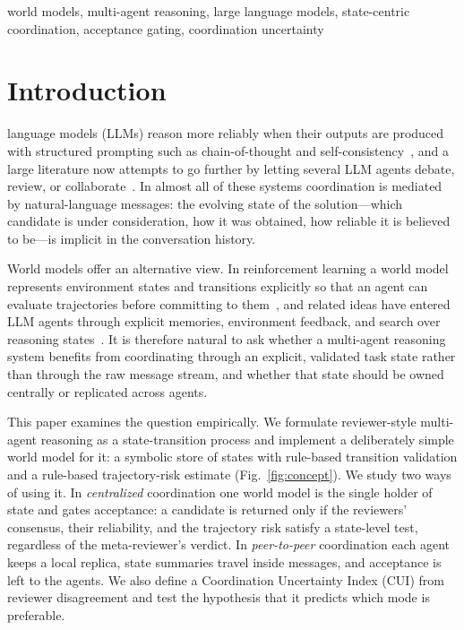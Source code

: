 \documentclass[lettersize,journal]{IEEEtran}
\begin{document}
\begin{IEEEkeywords}
world models, multi-agent reasoning, large language models, state-centric coordination, acceptance gating, coordination uncertainty
\end{IEEEkeywords}

\section{Introduction}

 language models (LLMs) reason more reliably when their outputs are produced with structured prompting such as chain-of-thought and self-consistency~\cite{wei2022chain,wang2023selfconsistency}, and a large literature now attempts to go further by letting several LLM agents debate, review, or collaborate~\cite{du2024improving,liang2024mad,chen2024reconcile,qian2024chatdev,hong2024metagpt,wang2025mars}.
In almost all of these systems coordination is mediated by natural-language messages: the evolving state of the solution---which candidate is under consideration, how it was obtained, how reliable it is believed to be---is implicit in the conversation history.

World models offer an alternative view. In reinforcement learning a world model represents environment states and transitions explicitly so that an agent can evaluate trajectories before committing to them~\cite{ha2018recurrent,hafner2020dream}, and related ideas have entered LLM agents through explicit memories, environment feedback, and search over reasoning states~\cite{park2023generative,wang2024voyager,yao2023react,hao2023rap}.
It is therefore natural to ask whether a multi-agent reasoning system benefits from coordinating through an explicit, validated task state rather than through the raw message stream, and whether that state should be owned centrally or replicated across agents.

This paper examines the question empirically. We formulate reviewer-style multi-agent reasoning as a state-transition process and implement a deliberately simple world model for it: a symbolic store of states with rule-based transition validation and a rule-based trajectory-risk estimate (Fig.~\ref{fig:concept}).
We study two ways of using it.
In \emph{centralized} coordination one world model is the single holder of state and gates acceptance: a candidate is returned only if the reviewers' consensus, their reliability, and the trajectory risk satisfy a state-level test, regardless of the meta-reviewer's verdict.
In \emph{peer-to-peer} coordination each agent keeps a local replica, state summaries travel inside messages, and acceptance is left to the agents.
We also define a Coordination Uncertainty Index (CUI) from reviewer disagreement and test the hypothesis that it predicts which mode is preferable.
\end{document}
